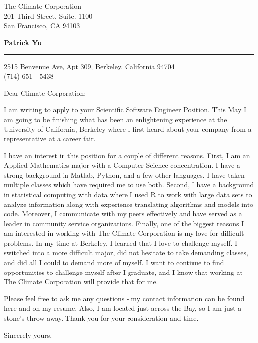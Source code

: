 \documentclass{letter} %
\begin{document}
\signature{Patrick Yu}           %
\longindentation=0pt                       %
\let\raggedleft\raggedright                %
 
 
\begin{letter}{
The Climate Corporation\\
201 Third Street, Suite. 1100\\
San Francisco, CA 94103}

\begin{flushleft}
{\large\bf Patrick Yu}
\end{flushleft}
\medskip\hrule height 1pt
\begin{flushright}
\hfill 2515 Benvenue Ave, Apt 309, Berkeley, California 94704 \\
\hfill (714) 651 - 5438
\end{flushright} 
\vfill %

 
\opening{Dear Climate Corporation:} 
 
\noindent I am writing to apply to your Scientific Software Engineer Position. This May I am going to be finishing what has been an enlightening experience at the University of California, Berkeley where I first heard about your company from a representative at a career fair.

\noindent I have an interest in this position for a couple of different reasons. First, I am an Applied Mathematics major with a Computer Science concentration. I have a strong background in Matlab, Python, and a few other languages. I have taken multiple classes which have required me to use both. Second, I have a background in statistical computing with data where I used R to work with large data sets to analyze information along with experience translating algorithms and models into code. Moreover, I communicate with my peers effectively and have served as a leader in community service organizations. Finally, one of the biggest reasons I am interested in working with The Climate Corporation is my love for difficult problems. In my time at Berkeley, I learned that I love to challenge myself. I switched into a more difficult major, did not hesitate to take demanding classes, and did all I could to demand more of myself. I want to continue to find opportunities to challenge myself after I graduate, and I know that working at The Climate Corporation will provide that for me.

\noindent Please feel free to ask me any questions - my contact information can be found here and on my resume. Also, I am located just across the Bay, so I am just a stone's throw away. Thank you for your consideration and time.
 
\closing{Sincerely yours,} 
 

 

\end{letter}
 
\end{document}
